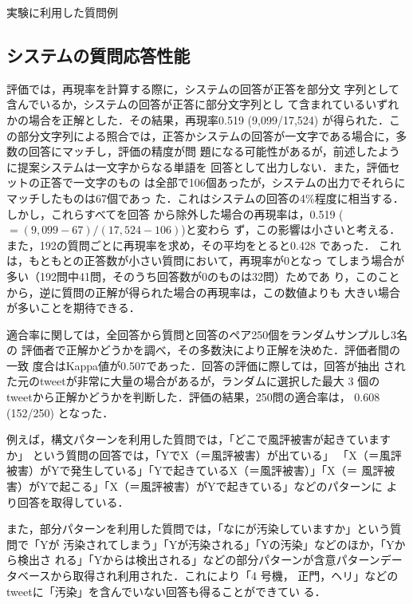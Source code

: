 \documentclass[japanese]{jnlp_1.4}
\begin{document}
\begin{table}[t]
\caption{実験に利用した質問例}
\label{Q_example}

\end{table}


\subsection{システムの質問応答性能}
\label{Eval_QA}

評価では，再現率を計算する際に，システムの回答が正答を部分文
字列として含んでいるか，システムの回答が正答に部分文字列とし
て含まれているいずれかの場合を正解とした．その結果，再現率0.519 (9,099/17,524) 
が得られた．この部分文字列による照合では，正答かシステムの回答が一文字である場合に，多数の回答にマッチし，評価の精度が問
題になる可能性があるが，前述したように提案システムは一文字からなる単語を
回答として出力しない．また，評価セットの正答で一文字のもの
は全部で106個あったが，システムの出力でそれらにマッチしたものは67個であっ
た．これはシステムの回答の4\%程度に相当する．しかし，これらすべてを回答
から除外した場合の再現率は，0.519 ($=(9,099-67)/(17,524-106)$)と変わら
ず，この影響は小さいと考える．
また，192の質問ごとに再現率を求め，その平均をとると0.428 であった．
これは，もともとの正答数が小さい質問において，再現率が0となっ
てしまう場合が多い（192問中41問，そのうち回答数が0のものは32問）ためであ
り，このことから，逆に質問の正解が得られた場合の再現率は，この数値よりも
大きい場合が多いことを期待できる．
 
適合率に関しては，全回答から質問と回答のペア250個をランダムサンプルし3名の
評価者で正解かどうかを調べ，その多数決により正解を決めた．評価者間の一致
度合はKappa値\cite{Fleiss1971}が0.507であった．回答の評価に際しては，回答が抽出
された元のtweetが非常に大量の場合があるが，ランダムに選択した最大 3 個の
tweetから正解かどうかを判断した．評価の結果，250問の適合率は，
0.608 (152/250) となった．

例えば，構文パターンを利用した質問では，「どこで風評被害が起きていますか」
という質問の回答では，「YでX（＝風評被害）が出ている」
「X（＝風評被害）がYで発生している」「Yで起きているX（＝風評被害）」「X（＝
風評被害）がYで起こる」「X（＝風評被害）がYで起きている」などのパターンに
より回答を取得している．

また，部分パターンを利用した質問では，「なにが汚染していますか」という質問で「Yが
汚染されてしまう」「Yが汚染される」「Yの汚染」などのほか，「Yから検出さ
れる」「Yからは検出される」などの部分パターンが含意パターンデータベースから取得され利用された．これにより「4 号機，
正門，ヘリ」などのtweetに「汚染」を含んでいない回答も得ることができてい
る．
\end{document}
